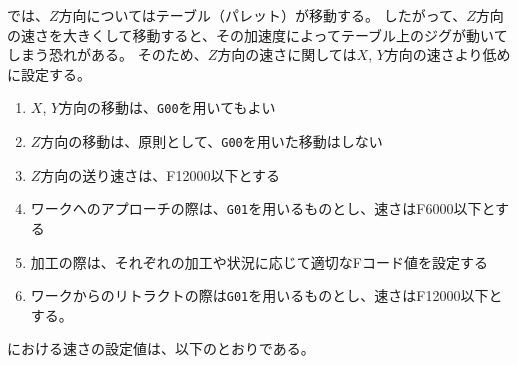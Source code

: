 \DMname では、$Z$方向についてはテーブル（パレット）が移動する。
したがって、$Z$方向の速さを大きくして移動すると、その加速度によってテーブル上のジグが動いてしまう恐れがある。
そのため、$Z$方向の速さに関しては$X$, $Y$方向の速さより低めに設定する。
\begin{enumerate}[label=\Roman*., ref=\Roman*]
\item $X$, $Y$方向の移動は、\verb|G00|を用いてもよい
\item $Z$方向の移動は、原則として、\verb|G00|を用いた移動はしない
\item $Z$方向の送り速さは、F12000以下とする
\item ワークへのアプローチの際は、\verb|G01|を用いるものとし、速さはF6000以下とする
\item 加工の際は、それぞれの加工や状況に応じて適切なFコード値を設定する
\item ワークからのリトラクトの際は\verb|G01|を用いるものとし、速さはF12000以下とする。
\end{enumerate}


\clearpage
\noindent
\dateKouguSpeed における速さの設定値は、以下のとおりである。\\

